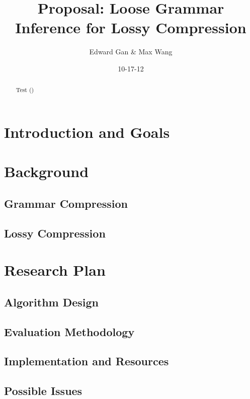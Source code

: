 \documentclass[11pt]{article}
\begin{document}


\title{Proposal: Loose Grammar Inference for Lossy Compression}
\author{Edward Gan \& Max Wang}
\date{10-17-12}
\maketitle

\begin{abstract}
Test (\cite{sequitur})
\end{abstract}

\section{Introduction and Goals}

\section{Background}

\subsection{Grammar Compression}

\subsection{Lossy Compression}

\section{Research Plan}

\subsection{Algorithm Design}

\subsection{Evaluation Methodology}

\subsection{Implementation and Resources}

\subsection{Possible Issues}

\nocite{*}


\end{document}

